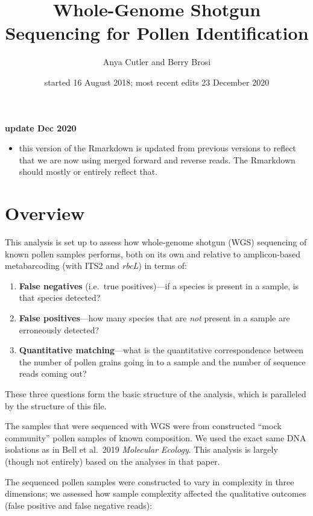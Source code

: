 \documentclass[
]{article}
\title{Whole-Genome Shotgun Sequencing for Pollen Identification}
\author{Anya Cutler and Berry Brosi}
\date{started 16 August 2018; most recent edits 23 December 2020}
\providecommand{\tightlist}{%
  \setlength{\itemsep}{0pt}\setlength{\parskip}{0pt}}
\begin{document}
\maketitle

{
\setcounter{tocdepth}{4}
\tableofcontents
}
\textbf{update Dec 2020}

\begin{itemize}
\tightlist
\item
  this version of the Rmarkdown is updated from previous versions to
  reflect that we are now using merged forward and reverse reads. The
  Rmarkdown should mostly or entirely reflect that.
\end{itemize}

\hypertarget{overview}{%
\section{Overview}\label{overview}}

This analysis is set up to assess how whole-genome shotgun (WGS)
sequencing of known pollen samples performs, both on its own and
relative to amplicon-based metabarcoding (with ITS2 and \emph{rbcL}) in
terms of:

\begin{enumerate}
\def\labelenumi{\arabic{enumi}.}
\tightlist
\item
  \textbf{False negatives} (i.e.~true positives)---if a species is
  present in a sample, is that species detected?
\item
  \textbf{False positives}---how many species that are \emph{not}
  present in a sample are erroneously detected?
\item
  \textbf{Quantitative matching}---what is the quantitative
  correspondence between the number of pollen grains going in to a
  sample and the number of sequence reads coming out?
\end{enumerate}

These three questions form the basic structure of the analysis, which is
paralleled by the structure of this file.

The samples that were sequenced with WGS were from constructed ``mock
community'' pollen samples of known composition. We used the exact same
DNA isolations as in Bell et al.~2019 \emph{Molecular Ecology}. This
analysis is largely (though not entirely) based on the analyses in that
paper.

The sequenced pollen samples were constructed to vary in complexity in
three dimensions; we assessed how sample complexity affected the
qualitative outcomes (false positive and false negative reads):
\end{document}
